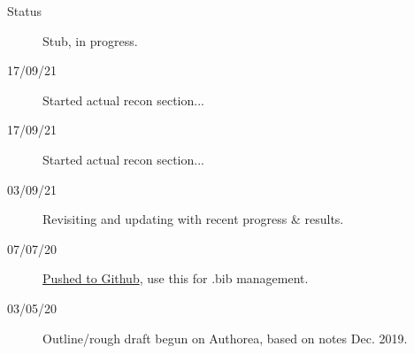 \begin{description}
\item [{Status}] Stub, in progress.
\item [{17/09/21}] Started actual recon section...
\item [{17/09/21}] Started actual recon section...
\item [{03/09/21}] Revisiting and updating with recent progress \& results.
\item [{07/07/20}] \href{https://github.com/phockett/Extracting-Molecular-Frame-Photoionization-Dynamics-from-Experimental-Data}{Pushed to Github}, use this for .bib management.
\item [{03/05/20}] Outline/rough draft begun on Authorea, based on notes Dec. 2019.
\end{description}